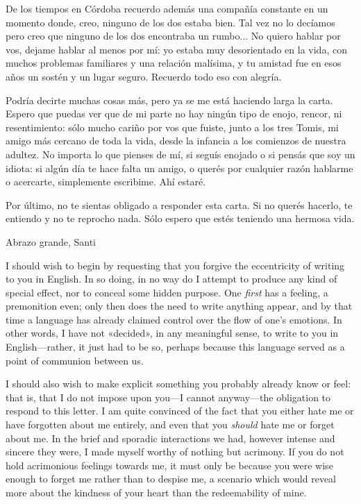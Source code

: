 \documentclass[a4paper]{article}
\begin{document}
De los tiempos en Córdoba recuerdo además una compañía constante en un momento
donde, creo, ninguno de los dos estaba bien. Tal vez no lo decíamos pero creo
que ninguno de los dos encontraba un rumbo... No quiero hablar por vos, dejame
hablar al menos por mí: yo estaba muy desorientado en la vida, con muchos
problemas familiares y una relación malísima, y tu amistad fue en esos años un
sostén y un lugar seguro. Recuerdo todo eso con alegría.

Podría decirte muchas cosas más, pero ya se me está haciendo larga la carta.
Espero que puedas ver que de mi parte no hay ningún tipo de enojo, rencor, ni
resentimiento: sólo mucho cariño por vos que fuiste, junto a los tres Tomis, mi
amigo más cercano de toda la vida, desde la infancia a los comienzos de nuestra
adultez. No importa lo que pienses de mí, si seguís enojado o si pensás que soy
un idiota: si algún día te hace falta un amigo, o querés por cualquier razón
hablarme o acercarte, simplemente escribime. Ahí estaré.


Por último, no te sientas obligado a responder esta carta. Si no querés hacerlo,
te entiendo y no te reprocho nada. Sólo espero que estés teniendo una hermosa vida.

Abrazo grande,\newline
Santi 


\pagebreak 

I should wish to begin by requesting that you forgive the eccentricity of
writing to you in English. In so doing, in no way do I attempt to produce any
kind of special effect, nor to conceal some hidden purpose. One \textit{first}
has a feeling, a premonition even; only then does the need to write anything
appear, and by that time a language has already claimed control over the flow
of one's emotions. In other words, I have not «decided», in any meaningful
sense, to write to you in English---rather, it just had to be so, perhaps
because this language served as a point of communion between us.

I should also wish to make explicit something you probably already know or feel:
that is, that I do not impose upon you---I cannot anyway---the obligation to
respond to this letter. I am quite convinced of the fact that you either hate me
or have forgotten about me entirely, and even that you \textit{should} hate me
or forget about me. In the brief and sporadic interactions we had, however
intense and sincere they were, I made myself worthy of nothing but acrimony. If
you do not hold acrimonious feelings towards me, it must only be because you
were wise enough to forget me rather than to despise me, a scenario which would
reveal more about the kindness of your heart than the redeemability of mine.
\end{document}
